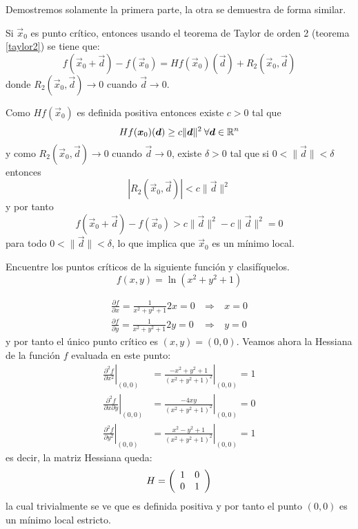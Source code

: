 \begin{demostracion}
Demostremos solamente la primera parte, la otra se demuestra de forma similar.

Si $\vec{x}_{0}$ es punto cr\'itico, entonces usando el teorema de Taylor de orden
2 (teorema \ref{taylor2}) se tiene que:
\[
f(\vec{x}_{0}+\vec{d})-f(\vec{x}_{0})=Hf(\vec{x}_{0})(\vec{d})+R_{2}(\vec{x}_{0},\vec{d})
\]
donde $R_{2}(\vec{x}_{0},\vec{d})\to 0$ cuando $\vec{d}\to 0$.

Como $Hf(\vec{x}_{0})$ es definida positiva entonces existe $c>0$ tal que
\[
Hf(\vec{x}_{0})(\vec{d})\geq c\|\vec{d}\|^{2}\:\forall \vec{d}\in\R^{n}%
\]
y como $R_{2}(\vec{x}_{0},\vec{d})\to 0$ cuando $\vec{d}\to 0$, existe
$\delta>0$ tal que si $0<\|\vec{d}\|  <\delta$ entonces
\[
|R_{2}(\vec{x}_{0},\vec{d})|<c\|\vec{d}\|^2%
\]
y por tanto
\[
f(\vec{x}_{0}+\vec{d})-f(\vec{x}_{0})>c\|\vec{d}\|^{2}-c\|\vec{d}\|^{2}=0
\]
para todo $0<\|\vec{d}\|<\delta$, lo que implica que $\vec{x}_{0}$ es un
m\'inimo local.
\end{demostracion}

\begin{ejemplo}
Encuentre los puntos cr\'iticos de la siguiente funci\'on y
clasif\'iquelos.
\[
f(x,y)=\ln(x^{2}+y^{2}+1)
\]
\end{ejemplo}

\begin{solucion}
\begin{eqnarray*}
\frac{\partial f}{\partial x}  =\frac{1}{x^{2}+y^{2}+1}2x=0 &\: \Rightarrow \:&
x=0\\
\frac{\partial f}{\partial y}  =\frac{1}{x^{2}+y^{2}+1}2y=0 &\: \Rightarrow \:&
y=0
\end{eqnarray*}
y por tanto el \'unico punto cr\'itico es $(x,y)=(0,0)$. Veamos ahora la
Hessiana de la funci\'on $f$ evaluada en este punto:
\begin{align*}
\left.  \frac{\partial^{2}f}{\partial x^{2}}\right|  _{(0,0)}  & =\left.
\frac{-x^{2}+y^{2}+1}{\left(  x^{2}+y^{2}+1\right)  ^{2}}\right|  _{(0,0)}=1\\
\left.  \frac{\partial^{2}f}{\partial x\partial y}\right|  _{(0,0)}  &
=\left.  \frac{-4xy}{\left(  x^{2}+y^{2}+1\right)  ^{2}}\right|  _{(0,0)}=0\\
\left.  \frac{\partial^{2}f}{\partial y^{2}}\right|  _{(0,0)}  & =\left.
\frac{x^{2}-y^{2}+1}{\left(  x^{2}+y^{2}+1\right)  ^{2}}\right|  _{(0,0)}=1
\end{align*}
es decir, la matriz Hessiana queda:
\[H=
\left(
\begin{array}
[c]{ll}%
1 & 0\\
0 & 1
\end{array}
\right)
\]
la cual trivialmente se ve que es definida positiva y por tanto el punto
$(0,0)$ es un m\'inimo local estricto.
\end{solucion}

